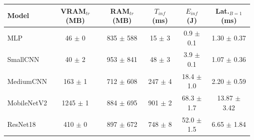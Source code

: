 \begin{tabular}{lccccc}
\toprule
Model & VRAM$_{tr}$ (MB) & RAM$_{tr}$ (MB) & $T_{inf}$ (ms) & $E_{inf}$ (J) & Lat.$_{B=1}$ (ms) \\
\midrule
MLP & 46 $\pm$ 0 & 835 $\pm$ 588 & 15 $\pm$ 3 & 0.9 $\pm$ 0.1 & 1.30 $\pm$ 0.37 \\
SmallCNN & 40 $\pm$ 2 & 953 $\pm$ 841 & 48 $\pm$ 3 & 3.9 $\pm$ 0.1 & 1.07 $\pm$ 0.36 \\
MediumCNN & 163 $\pm$ 1 & 712 $\pm$ 608 & 247 $\pm$ 4 & 18.4 $\pm$ 1.0 & 2.20 $\pm$ 0.59 \\
MobileNetV2 & 1245 $\pm$ 1 & 884 $\pm$ 695 & 901 $\pm$ 2 & 68.3 $\pm$ 1.7 & 13.87 $\pm$ 3.42 \\
ResNet18 & 410 $\pm$ 0 & 897 $\pm$ 672 & 748 $\pm$ 8 & 52.0 $\pm$ 1.5 & 6.65 $\pm$ 1.84 \\
\bottomrule
\end{tabular}